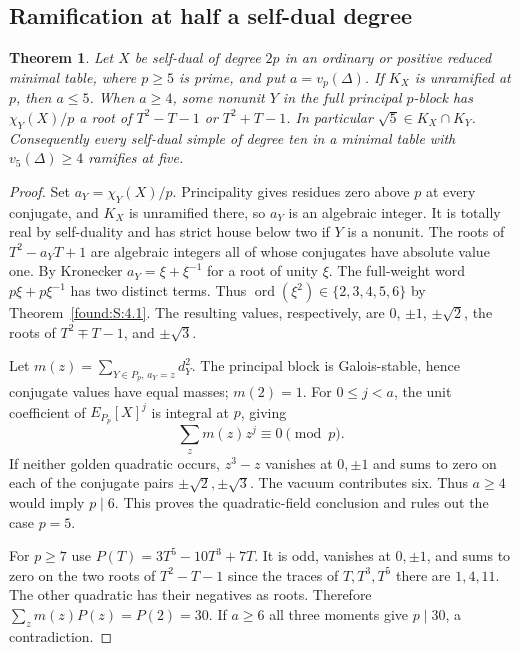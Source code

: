 \documentclass[11pt,a4paper]{article}
\numberwithin{equation}{section}
\newtheorem{theorem}{Theorem}[section]
\theoremstyle{remark}
\begin{document}
\subsection{Ramification at half a self-dual degree}\label{found:T:3}
\begin{theorem}\label{found:T:3.1}\label{found:T:key:local:twice}
Let $X$ be self-dual of degree $2p$ in an ordinary or positive reduced
minimal table, where $p\ge5$ is prime, and put $a=v_p(\Delta)$.
If $K_X$ is unramified at $p$, then $a\le5$. When $a\ge4$, some
nonunit $Y$ in the full principal $p$-block has
$\chi_Y(X)/p$ a root of $T^2-T-1$ or $T^2+T-1$.
In particular $\sqrt5\in K_X\cap K_Y$.
Consequently every self-dual simple of degree ten in a minimal table
with $v_5(\Delta)\ge4$ ramifies at five.
\end{theorem}
\begin{proof}
Set $a_Y=\chi_Y(X)/p$. Principality gives residues zero above $p$
at every conjugate, and $K_X$ is unramified there, so $a_Y$ is an
algebraic integer. It is totally real by self-duality and has strict
house below two if $Y$ is a nonunit. The roots of $T^2-a_YT+1$ are
algebraic integers all of whose conjugates have absolute value one.
By Kronecker $a_Y=\xi+\xi^{-1}$ for a root of unity $\xi$.
The full-weight word $p\xi+p\xi^{-1}$ has two distinct terms.
Thus $\operatorname{ord}(\xi^2)\in\{2,3,4,5,6\}$ by Theorem~\ref{found:S:4.1}.
The resulting values, respectively, are $0$, $\pm1$, $\pm\sqrt2$,
the roots of $T^2\mp T-1$, and $\pm\sqrt3$.

Let $m(z)=\sum_{Y\in P_p,\,a_Y=z}d_Y^2$. The principal block is
Galois-stable, hence conjugate values have equal masses; $m(2)=1$.
For $0\le j<a$, the unit coefficient of $E_{P_p}[X]^j$ is integral
at $p$, giving
\[
   \sum_z m(z)z^j\equiv0\pmod p .
\]
If neither golden quadratic occurs, $z^3-z$ vanishes at $0,\pm1$ and
sums to zero on each of the conjugate pairs $\pm\sqrt2,\pm\sqrt3$.
The vacuum contributes six. Thus $a\ge4$ would imply $p\mid6$.
This proves the quadratic-field conclusion and rules out the case $p=5$.

For $p\ge7$ use $P(T)=3T^5-10T^3+7T$. It is odd, vanishes at $0,\pm1$,
and sums to zero on the two roots of $T^2-T-1$ since the traces of
$T,T^3,T^5$ there are $1,4,11$. The other quadratic has their negatives
as roots. Therefore $\sum_z m(z)P(z)=P(2)=30$.
If $a\ge6$ all three moments give $p\mid30$, a contradiction.
\end{proof}
\end{document}
